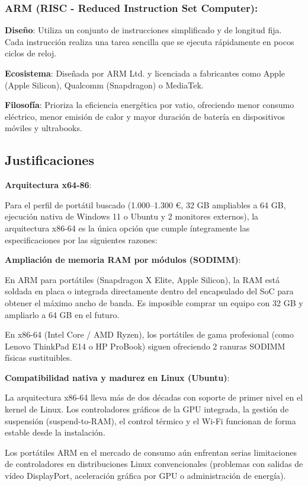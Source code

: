\documentclass[11.5pt]{article}
\begin{document}
\begin{tcolorbox}[colback=blue!5!white, colframe=blue!75!black, title=\textbf{TIP}]
	\subsubsection*{ARM (RISC - Reduced Instruction Set Computer):}
	
	\textbf{Diseño}: Utiliza un conjunto de instrucciones simplificado y de longitud fija. Cada instrucción realiza una tarea sencilla que se ejecuta rápidamente en pocos ciclos de reloj.
	
	\textbf{Ecosistema}: Diseñada por ARM Ltd. y licenciada a fabricantes como Apple (Apple Silicon), Qualcomm (Snapdragon) o MediaTek.
	
	\textbf{Filosofía}: Prioriza la eficiencia energética por vatio, ofreciendo menor consumo eléctrico, menor emisión de calor y mayor duración de batería en dispositivos móviles y ultrabooks.
\end{tcolorbox}
	\subsection{Justificaciones}
	\textbf{Arquitectura x64-86}:
	
	Para el perfil de portátil buscado (1.000–1.300 €, 32 GB ampliables a 64 GB, ejecución nativa de Windows 11 o Ubuntu y 2 monitores externos), la arquitectura x86-64 es la única opción que cumple íntegramente las especificaciones por las siguientes razones:
	
	\textbf{Ampliación de memoria RAM por módulos (SODIMM)}:
	
	En ARM para portátiles (Snapdragon X Elite, Apple Silicon), la RAM está soldada en placa o integrada directamente dentro del encapsulado del SoC para obtener el máximo ancho de banda. Es imposible comprar un equipo con 32 GB y ampliarlo a 64 GB en el futuro.
	
	En x86-64 (Intel Core / AMD Ryzen), los portátiles de gama profesional (como Lenovo ThinkPad E14 o HP ProBook) siguen ofreciendo 2 ranuras SODIMM físicas sustituibles.
	
	\textbf{Compatibilidad nativa y madurez en Linux (Ubuntu)}:
	
	La arquitectura x86-64 lleva más de dos décadas con soporte de primer nivel en el kernel de Linux. Los controladores gráficos de la GPU integrada, la gestión de suspensión (suspend-to-RAM), el control térmico y el Wi-Fi funcionan de forma estable desde la instalación.
	
	Los portátiles ARM en el mercado de consumo aún enfrentan serias limitaciones de controladores en distribuciones Linux convencionales (problemas con salidas de vídeo DisplayPort, aceleración gráfica por GPU o administración de energía).
	
\end{document}
